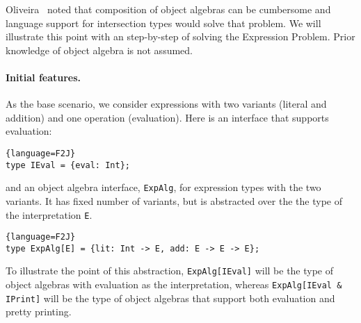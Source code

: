 



Oliveira~\cite{} noted that composition of object algebras can be cumbersome and
language support for intersection types would solve that problem. 
We will illustrate this point with an step-by-step of solving the Expression
Problem. Prior knowledge of object algebra is not assumed.

\paragraph{Initial features.}
As the base scenario, we consider expressions with two variants (literal and
addition) and one operation (evaluation). Here is an interface that supports
evaluation:
\begin{lstlisting}{language=F2J}
type IEval = {eval: Int};
\end{lstlisting}
and an object algebra interface, \lstinline$ExpAlg$, for expression types with
the two variants. It has fixed number of variants, but is abstracted over the
the type of the interpretation \lstinline$E$.
\begin{lstlisting}{language=F2J}
type ExpAlg[E] = {lit: Int -> E, add: E -> E -> E};
\end{lstlisting}
To illustrate the point of this abstraction, \lstinline$ExpAlg[IEval]$ will be
the type of object algebras with evaluation as the interpretation, whereas
\lstinline$ExpAlg[IEval & IPrint]$ will be the type of object algebras that
support both evaluation and pretty printing.

